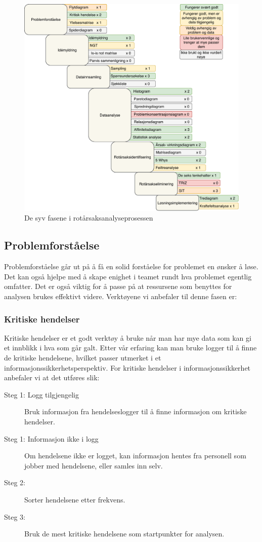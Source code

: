 \begin{figure}[H]
    \centering
    \includegraphics[scale=0.6]{main/bilder/RCA_Prosess_rettningslinjer.pdf}
    \caption[RCA-prosess]{De syv fasene i rotårsaksanalyseprosessen}
    \label{fig:prosess_veileder}
\end{figure}

\subsection{Problemforståelse}
Problemforståelse går ut på å få en solid forståelse for problemet en ønsker å løse. Det kan også hjelpe med å skape enighet i teamet rundt hva problemet egentlig omfatter. Det er også viktig for å passe på at ressursene som benyttes for analysen brukes effektivt videre. 
Verktøyene vi anbefaler til denne fasen er: 

\subsubsection{Kritiske hendelser} 
Kritiske hendelser er et godt verktøy å bruke når man har mye data som kan gi et innblikk i hva som går galt. Etter vår erfaring kan man bruke logger til å finne de kritiske hendelsene, hvilket passer utmerket i et informasjonssikkerhetsperspektiv. For kritiske hendelser i informasjonssikkerhet anbefaler vi at det utføres slik: 
\begin{description}
    \item [Steg 1: Logg tilgjengelig] Bruk informasjon fra hendelseslogger til å finne informasjon om kritiske hendelser.
    \item [Steg 1: Informasjon ikke i logg] Om hendelsene ikke er logget, kan informasjon hentes fra personell som jobber med hendelsene, eller samles inn selv.
    \item [Steg 2:] Sorter hendelsene etter frekvens.
    \item [Steg 3:] Bruk de mest kritiske hendelsene som startpunkter for analysen.
\end{description}

